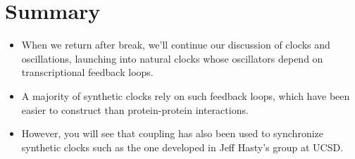 \documentclass{article}
\begin{document}
\section*{Summary}

\begin{itemize}
\item When we return after break, we'll continue our discussion of clocks and oscillations, launching into natural clocks whose oscillators depend on transcriptional feedback loops.
\item A majority of synthetic clocks rely on such feedback loops, which have been easier to construct than protein-protein interactions.
\item However, you will see that coupling has also been used to synchronize synthetic clocks such as the one developed in Jeff Hasty's group at UCSD.
\end{itemize}
\end{document}
